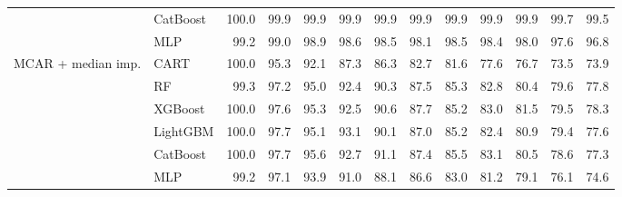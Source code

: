 \begin{table}[p]
\begin{tabular}{@{}llrrrrrrrrrrr@{}}
 & CatBoost & 100.0 & 99.9 & 99.9 & 99.9 & 99.9 & 99.9 & 99.9 & 99.9 & 99.9 & 99.7 & 99.5 \\
 & MLP & 99.2 & 99.0 & 98.9 & 98.6 & 98.5 & 98.1 & 98.5 & 98.4 & 98.0 & 97.6 & 96.8 \\
\midrule
MCAR + median imp. & CART & 100.0 & 95.3 & 92.1 & 87.3 & 86.3 & 82.7 & 81.6 & 77.6 & 76.7 & 73.5 & 73.9 \\
 & RF & 99.3 & 97.2 & 95.0 & 92.4 & 90.3 & 87.5 & 85.3 & 82.8 & 80.4 & 79.6 & 77.8 \\
 & XGBoost & 100.0 & 97.6 & 95.3 & 92.5 & 90.6 & 87.7 & 85.2 & 83.0 & 81.5 & 79.5 & 78.3 \\
 & LightGBM & 100.0 & 97.7 & 95.1 & 93.1 & 90.1 & 87.0 & 85.2 & 82.4 & 80.9 & 79.4 & 77.6 \\
 & CatBoost & 100.0 & 97.7 & 95.6 & 92.7 & 91.1 & 87.4 & 85.5 & 83.1 & 80.5 & 78.6 & 77.3 \\
 & MLP & 99.2 & 97.1 & 93.9 & 91.0 & 88.1 & 86.6 & 83.0 & 81.2 & 79.1 & 76.1 & 74.6 \\
\bottomrule
\end{tabular}
\end{table}

